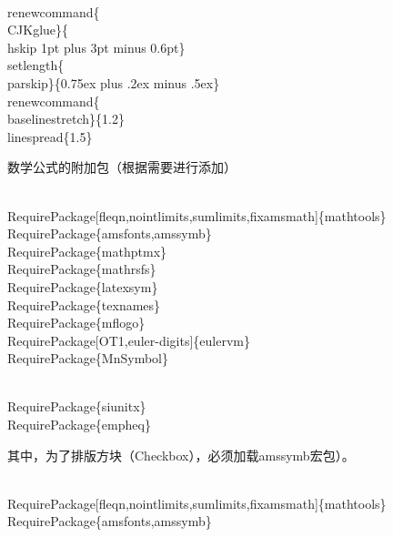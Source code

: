 \documentclass{hnuthesis}%
\begin{document}
\begin{nowebtrunk}
\nwenddocs{}\endmoddef\nwstartdeflinemarkup\nwenddeflinemarkup
\\renewcommand\{\\CJKglue\}\{\\hskip 1pt plus 3pt minus 0.6pt\}
\\setlength\{\\parskip\}\{0.75ex plus .2ex minus .5ex\}
\\renewcommand\{\\baselinestretch\}\{1.2\}
\\linespread\{1.5\}
\nwendcode{}\end{nowebtrunk}


数学公式的附加包（根据需要进行添加）

\begin{nowebtrunk}
\nwenddocs{}\endmoddef\nwstartdeflinemarkup\nwenddeflinemarkup
\\RequirePackage[fleqn,nointlimits,sumlimits,fixamsmath]\{mathtools\}
\\RequirePackage\{amsfonts,amssymb\}
\\RequirePackage\{mathptmx\}
\\RequirePackage\{mathrsfs\}
\\RequirePackage\{latexsym\}
\\RequirePackage\{texnames\}
\\RequirePackage\{mflogo\}
\\RequirePackage[OT1,euler-digits]\{eulervm\}
\\RequirePackage\{MnSymbol\}

\\RequirePackage\{siunitx\}
\\RequirePackage\{empheq\}
\nwendcode{}\end{nowebtrunk}

其中，为了排版方块（Checkbox），必须加载amssymb宏包）。

\begin{nowebtrunk}
\nwenddocs{}\plusendmoddef\nwstartdeflinemarkup{}\nwenddeflinemarkup
\\RequirePackage[fleqn,nointlimits,sumlimits,fixamsmath]\{mathtools\}
\\RequirePackage\{amsfonts,amssymb\}
\nwendcode{}\end{nowebtrunk}
\end{document}
